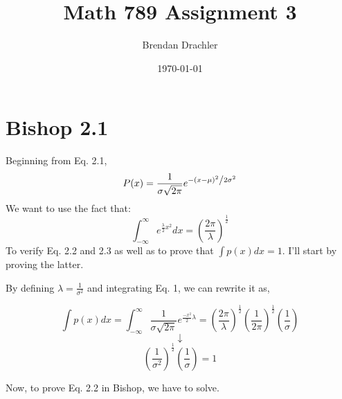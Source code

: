 \documentclass[12pt, letterpaper]{article}
\title{Math 789 Assignment 3}
\author{Brendan Drachler}
\date{\today}
\begin{document}
\begin{titlepage}
\maketitle
\end{titlepage}
\section*{Bishop 2.1}
Beginning from Eq. 2.1, 
\begin{equation}
P(x) = \frac{1}{{\sigma \sqrt {2\pi } }}e^{{{ - \left( {x - \mu } \right)^2 } \mathord{\left/ {\vphantom {{ - \left( {x - \mu } \right)^2 } {2\sigma ^2 }}} \right. \kern-\nulldelimiterspace} {2\sigma ^2 }}}
\end{equation}
We want to use the fact that:
\begin{equation}
\int_{-\infty}^{\infty} e^{\frac{\lambda}{2} x^2} dx = (\frac{2 \pi}{\lambda})^{\frac{1}{2}}
\end{equation}
To verify Eq. 2.2 and 2.3 as well as to prove that $\int p(x) dx = 1$. I'll start by proving the latter.


By defining $\lambda = \frac{1}{\sigma^2}$ and integrating Eq. 1, we can rewrite it as, 

\begin{equation}
\int p(x) dx = \int_{-\infty}^{\infty} \frac{1}{{\sigma \sqrt {2\pi } }}e^{\frac{-x^2}{2} \lambda} = (\frac{2 \pi}{\lambda})^{\frac{1}{2}} (\frac{1}{2 \pi})^{\frac{1}{2}} (\frac{1}{\sigma}) 
\end{equation}
\begin{equation}
\downarrow
\end{equation}
\begin{equation}
(\frac{1}{\sigma^2})^{\frac{1}{2}} (\frac{1}{\sigma}) = 1
\end{equation}

Now, to prove Eq. 2.2 in Bishop, we have to solve.
\end{document}
